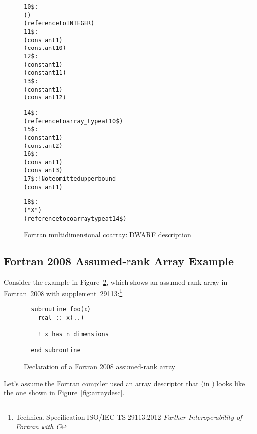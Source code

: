 \begin{figure}[here]
\begin{dwflisting}
\begin{alltt}
10\$: \DWTAGarraytype
        \DWATordering(\DWORDcolmajor)
        \DWATtype(reference to INTEGER)
11\$:    \DWTAGsubrangetype
            \DWATlowerbound(constant 1)
            \DWATupperbound(constant 10)
12\$:    \DWTAGsubrangetype
            \DWATlowerbound(constant  1)
            \DWATupperbound(constant 11)
13\$:    \DWTAGsubrangetype
            \DWATlowerbound(constant  1)
            \DWATupperbound(constant 12)

14\$: \DWTAGcoarraytype
        \DWATtype(reference to array_type at 10\$)
15\$:    \DWTAGsubrangetype
            \DWATlowerbound(constant 1)
            \DWATupperbound(constant 2)
16\$:    \DWTAGsubrangetype
            \DWATlowerbound(constant 1)
            \DWATupperbound(constant 3)
17\$:    \DWTAGsubrangetype                ! Note omitted upper bound
            \DWATlowerbound(constant 1)

18\$: \DWTAGvariable
        \DWATname("X")
        \DWATtype(reference to coarray type at 14\$)
\end{alltt}
\end{dwflisting}
\caption{Fortran multidimensional coarray: DWARF description}
\label{fig:FortranmultidimensionalcoarrayDWARFdescription}
\end{figure}


\clearpage
\subsection{Fortran 2008 Assumed-rank Array Example}
\label{app:assumedrankexample}
Consider the example in Figure~\ref{fig:assumedrankdecl}, which shows
an assumed-rank array in Fortran~2008 with
supplement~29113:\footnote{Technical Specification ISO/IEC TS
  29113:2012 \emph{Further Interoperability of Fortran with C}}

\begin{figure}[!h]
\begin{lstlisting}
  subroutine foo(x)
    real :: x(..)

    ! x has n dimensions
  
  end subroutine
\end{lstlisting}
\caption{Declaration of a Fortran 2008 assumed-rank array}
\label{fig:assumedrankdecl}
\end{figure}

Let's assume the Fortran compiler used an array descriptor that
(in ) looks
like the one shown in Figure~\ref{fig:arraydesc}.

